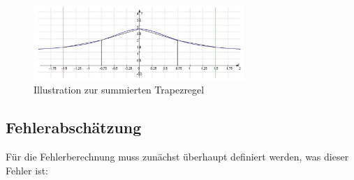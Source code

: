 \begin{figure}[h]
  \centering
        \includegraphics[width=8cm]{Bilder/Trapezregel.png}
      \caption{Illustration zur summierten Trapezregel \cite{vollskript}}
      \label{fig:sehnentrapeze_eins}
    \end{figure}
%
%
%
%
%
\subsection{Fehlerabschätzung}
\label{sec:fehlerabschätzung}

Für die Fehlerberechnung muss zunächst überhaupt definiert werden, was dieser Fehler ist:
